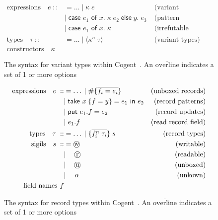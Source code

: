 \begin{figure}
    \centering

    \begin{align*}
        \text{expressions}\quad e\; 
            ::&= \dots\; |\; \kappa\; e & \text{(variant constructor)} \\
              &|\; \textsf{case } e_1 \textsf{ of } x.\; \kappa\; e_2\;
                   \textsf{else}\; y.\; e_3 \; & \text{(pattern matching)} \\
              &|\; \textsf{case } e_1 \textsf{ of } x.\; \kappa\; 
                   & \text{(irrefutable match)} \\
        \text{types}\quad \tau\;
            ::&= \dots\; |\; \langle \overline{\kappa^n\; \tau} \rangle & \text{(variant types)} \\
        \text{constructors}\quad \kappa
    \end{align*}

    \caption{The syntax for variant types within Cogent~\citep{ICFPCogent}. An $\overline{\text{overline}}$ indicates a set of 1 or more options}
    \label{fig:variantGrammar}
\end{figure}

\begin{figure}
    \centering
    \begin{align*}
        \text{expressions}\quad e\; 
            ::&= \dots\; |\; \#\{\overline{f_i = e_i}\} & \text{(unboxed records)} \\
              &|\; \textsf{take } x\; \{ f = y\} = e_1 \textsf{ in } e_2 & \text{(record patterns)} \\
              &|\; \textsf{put } e_1.f = e_2 & \text{(record updates)} \\
              &|\; e_1.f & \text{(read record field)} \\
        \text{types}\quad \tau\;
            ::&= \dots\; |\; \{ \overline{f_i^n\; \tau_i} \}\; s & \text{(record types)} \\
        \text{sigils}\quad s\;
            ::&= \text{\textcircled{w}} & \text{(writable)} \\
            &|\quad\, \text{\textcircled{r}} & \text{(readable)}\\
            &|\quad\, \text{\textcircled{u}} & \text{(unboxed)}\\
            &|\quad\; \alpha & \text{(unkown)}\\
        \text{field names } f
    \end{align*}
    \caption{The syntax for record types within Cogent~\citep{ICFPCogent}. An $\overline{\text{overline}}$ indicates a set of 1 or more options}
    \label{fig:recordGrammar}
\end{figure}



